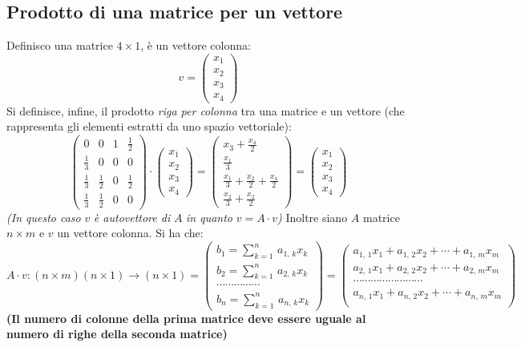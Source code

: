 \documentclass[a4paper,12pt, oneside]{book}
\begin{document}
\subsection{Prodotto di una matrice per un vettore}
Definisco una matrice $4\times 1$, è un vettore colonna:
$$v=\left(\begin{matrix}
			x_1 \\
			x_2 \\
			x_3 \\
			x_4
		\end{matrix}\right)$$
Si definisce, infine, il prodotto \textit{riga per colonna} tra una matrice e un vettore (che rappresenta gli elementi estratti da uno spazio vettoriale):
$$\left(\begin{matrix}
			0           & 0           & 1 & \frac{1}{2} \\
			\frac{1}{3} & 0           & 0 & 0           \\
			\frac{1}{3} & \frac{1}{2} & 0 & \frac{1}{2} \\
			\frac{1}{3} & \frac{1}{2} & 0 & 0
		\end{matrix}\right)\cdot \left(\begin{matrix}
			x_1 \\
			x_2 \\
			x_3 \\
			x_4
		\end{matrix}\right)=\left(\begin{matrix}
			x_3+\frac{x_4}{2}                         \\
			\frac{x_1}{3}                             \\
			\frac{x_1}{3}+\frac{x_2}{2}+\frac{x_4}{2} \\
			\frac{x_2}{3} +\frac{x_2}{2}
		\end{matrix}\right)=\left(\begin{matrix}
			x_1 \\
			x_2 \\
			x_3 \\
			x_4
		\end{matrix}\right)
$$
\textit{(In questo caso} $v$ \textit{è autovettore di }$A$ \textit{in quanto} $v=A\cdot v$\textit{)}
Inoltre siano $A$ matrice $n\times	m$ e $v$ un vettore colonna. Si ha che:
$$A\cdot v:(n\times m)(n\times 1)\rightarrow (n\times 1)=\left(\begin{matrix}
			b_1=\sum_{k=1}^n\,a_{1,\,k}x_k \\
			b_2=\sum_{k=1}^n\,a_{2,\,k}x_k \\
			\cdots\cdots\cdots\cdots\cdots \\
			b_n=\sum_{k=1}^n\,a_{n,\,k}x_k
		\end{matrix}\right)=\left(\begin{matrix}
			a_{1,\,1}x_1+a_{1,\,2}x_2+\cdots+a_{1,\,m}x_m    \\
			a_{2,\,1}x_1+a_{2,\,2}x_2+\cdots+a_{2,\,m}x_m    \\
			\cdots\cdots\cdots\cdots\cdots\cdots\cdots\cdots \\
			a_{n,\,1}x_1+a_{n,\,2}x_2+\cdots+a_{n,\,m}x_m    \\
		\end{matrix}\right)$$
\textbf{(Il numero di colonne della prima matrice deve essere uguale al numero di righe della seconda matrice)}
\end{document}
